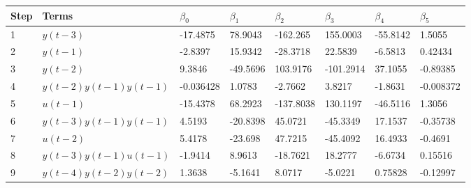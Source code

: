 \begin{tabular}{llllllll}
Step & Terms & $\beta_{0}$ & $\beta_{1}$ & $\beta_{2}$ & $\beta_{3}$ & $\beta_{4}$ & $\beta_{5}$ \\ 
\hline 
1 & $y(t-3)$ & -17.4875 & 78.9043 & -162.265 & 155.0003 & -55.8142 & 1.5055 \\ 
2 & $y(t-1)$ & -2.8397 & 15.9342 & -28.3718 & 22.5839 & -6.5813 & 0.42434 \\ 
3 & $y(t-2)$ & 9.3846 & -49.5696 & 103.9176 & -101.2914 & 37.1055 & -0.89385 \\ 
4 & $y(t-2)y(t-1)y(t-1)$ & -0.036428 & 1.0783 & -2.7662 & 3.8217 & -1.8631 & -0.008372 \\ 
5 & $u(t-1)$ & -15.4378 & 68.2923 & -137.8038 & 130.1197 & -46.5116 & 1.3056 \\ 
6 & $y(t-3)y(t-1)y(t-1)$ & 4.5193 & -20.8398 & 45.0721 & -45.3349 & 17.1537 & -0.35738 \\ 
7 & $u(t-2)$ & 5.4178 & -23.698 & 47.7215 & -45.4092 & 16.4933 & -0.4691 \\ 
8 & $y(t-3)y(t-1)u(t-1)$ & -1.9414 & 8.9613 & -18.7621 & 18.2777 & -6.6734 & 0.15516 \\ 
9 & $y(t-4)y(t-2)y(t-2)$ & 1.3638 & -5.1641 & 8.0717 & -5.0221 & 0.75828 & -0.12997 \\ 
\hline 
\end{tabular}